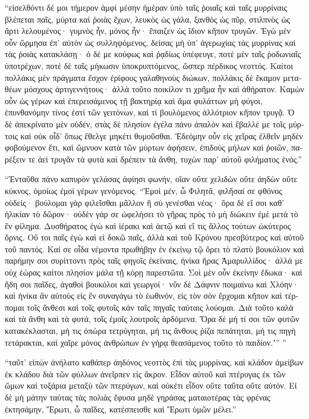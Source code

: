 \documentclass{book}
\begin{document}
\begin{pairs}
\begin{Leftside}
\begin{greek}
  “εἰσελθόντι δέ μοι τήμερον ἀμφὶ μέσην ἡμέραν ὑπὸ ταῖς ῥοιαῖς καὶ ταῖς μυρρίναις βλέπεται παῖς, μύρτα καὶ ῥοιὰς ἔχων, λευκὸς ὡς γάλα, ξανθὸς ὡς πῦρ, στιλπνὸς ὡς ἄρτι λελουμένος· γυμνὸς ἦν, μόνος ἦν·  ἔπαιζεν ὡς ἴδιον κῆπον τρυγῶν. Ἐγὼ μὲν οὖν ὥρμησα ἐπ’ αὐτὸν ὡς συλληψόμενος, δείσας μὴ ὑπ’ ἀγερωχίας τὰς μυρρίνας καὶ τὰς ῥοιὰς κατακλάσῃ· ὁ δέ με κούφως καὶ ῥᾳδίως ὑπέφευγε, ποτὲ μὲν ταῖς ῥοδωνιαῖς ὑποτρέχων, ποτὲ δὲ ταῖς μήκωσιν ὑποκρυπτόμενος,  ὥσπερ πέρδικος νεοττός. Καίτοι πολλάκις μὲν πράγματα ἔσχον ἐρίφους γαλαθηνοὺς διώκων, πολλάκις δὲ ἔκαμον μεταθέων μόσχους ἀρτιγεννήτους· ἀλλὰ τοῦτο ποικίλον τι χρῆμα ἦν καὶ ἀθήρατον. Καμὼν οὖν ὡς γέρων καὶ ἐπερεισάμενος τῇ βακτηρίᾳ καὶ ἅμα φυλάττων μὴ φύγοι, ἐπυνθανόμην τίνος ἐστὶ τῶν γειτόνων, καὶ τί βουλόμενος ἀλλότριον κῆπον τρυγᾷ.  Ὁ δὲ ἀπεκρίνατο μὲν οὐδέν, στὰς δὲ πλησίον ἐγέλα πάνυ ἁπαλὸν καὶ ἔβαλλέ με τοῖς μύρτοις καὶ οὐκ οἶδ’ ὅπως ἔθελγε μηκέτι θυμοῦσθαι. Ἐδεόμην οὖν εἰς χεῖρας ἐλθεῖν μηδὲν φοβούμενον ἔτι, καὶ ὤμνυον κατὰ τῶν μύρτων ἀφήσειν, ἐπιδοὺς μήλων καὶ ῥοιῶν, παρέξειν τε ἀεὶ τρυγᾶν τὰ φυτὰ καὶ δρέπειν τὰ ἄνθη, τυχὼν παρ’ αὐτοῦ φιλήματος ἑνός.”
\pend


  “Ἐνταῦθα πάνυ καπυρὸν γελάσας ἀφίησι φωνήν, οἵαν οὔτε χελιδὼν οὔτε ἀηδὼν οὔτε κύκνος, ὁμοίως ἐμοὶ γέρων γενόμενος. “Ἐμοὶ μέν, ὦ Φιλητᾶ, φιλῆσαί σε φθόνος οὐδείς· βούλομαι γὰρ φιλεῖσθαι μᾶλλον ἢ σὺ γενέσθαι νέος· ὅρα δὲ εἴ σοι καθ’ ἡλικίαν τὸ δῶρον·  οὐδὲν γάρ σε ὠφελήσει τὸ γῆρας πρὸς τὸ μὴ διώκειν ἐμὲ μετὰ τὸ ἓν φίλημα. Δυσθήρατος ἐγὼ καὶ ἱέρακι καὶ ἀετῷ καὶ εἴ τις ἄλλος τούτων ὠκύτερος ὄρνις. Οὔ τοι παῖς ἐγὼ καὶ εἰ δοκῶ παῖς, ἀλλὰ καὶ τοῦ Κρόνου πρεσβύτερος καὶ αὐτοῦ τοῦ παντός.  Καί σε οἶδα νέμοντα πρωθήβην ἐν ἐκείνῳ τῷ ὄρει τὸ πλατὺ βουκόλιον καὶ παρήμην σοι συρίττοντι πρὸς ταῖς φηγοῖς ἐκείναις, ἡνίκα ἤρας Ἀμαρυλλίδος· ἀλλά με οὐχ ἑώρας καίτοι πλησίον μάλα τῇ κόρῃ παρεστῶτα. Σοὶ μὲν οὖν ἐκείνην ἔδωκα· καὶ ἤδη σοι παῖδες, ἀγαθοὶ βουκόλοι καὶ γεωργοί·  νῦν δὲ Δάφνιν ποιμαίνω καὶ Χλόην· καὶ ἡνίκα ἂν αὐτοὺς εἰς ἓν συναγάγω τὸ ἑωθινόν, εἰς τὸν σὸν ἔρχομαι κῆπον καὶ τέρπομαι τοῖς ἄνθεσι καὶ τοῖς φυτοῖς κἀν ταῖς πηγαῖς ταύταις λούομαι. Διὰ τοῦτο καλὰ καὶ τὰ ἄνθη καὶ τὰ φυτά, τοῖς ἐμοῖς λουτροῖς ἀρδόμενα.  Ὅρα δὲ μή τί σοι τῶν φυτῶν κατακέκλασται, μή τις ὀπώρα τετρύγηται, μή τις ἄνθους ῥίζα πεπάτηται, μή τις πηγὴ τετάρακται, καὶ χαῖρε μόνος ἀνθρώπων ἐν γήρᾳ θεασάμενος τοῦτο τὸ παιδίον.ʼ” ”
\pend


  “ταῦτ’ εἰπὼν ἀνήλατο καθάπερ ἀηδόνος νεοττὸς ἐπὶ τὰς μυρρίνας, καὶ κλάδον ἀμείβων ἐκ κλάδου διὰ τῶν φύλλων ἀνεῖρπεν εἰς ἄκρον. Εἶδον αὐτοῦ καὶ πτέρυγας ἐκ τῶν ὤμων καὶ τοξάρια μεταξὺ τῶν πτερύγων,  καὶ οὐκέτι εἶδον οὔτε ταῦτα οὔτε αὐτόν. Εἰ δὲ μὴ μάτην ταύτας τὰς πολιὰς ἔφυσα μηδὲ γηράσας ματαιοτέρας τὰς φρένας ἐκτησάμην, Ἔρωτι, ὦ παῖδες, κατέσπεισθε καὶ Ἔρωτι ὑμῶν μέλει.”
\pend



\end{greek}
\end{Leftside}
\end{pairs}
\end{document}
